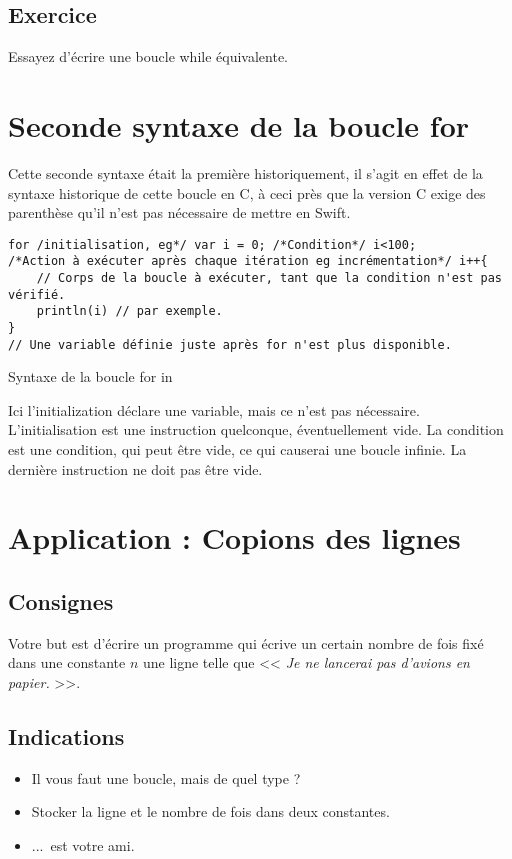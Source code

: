 \subsection{Exercice}
Essayez d'écrire une boucle while équivalente.

\section{Seconde syntaxe de la boucle for}
Cette seconde syntaxe était la première historiquement,
il s'agit en effet de la syntaxe historique de cette boucle en C,
à ceci près que la version C exige des parenthèse
qu'il n'est pas nécessaire de mettre en Swift.

\begin{listing}[h]
\begin{verbatim}
for /initialisation, eg*/ var i = 0; /*Condition*/ i<100;
/*Action à exécuter après chaque itération eg incrémentation*/ i++{
    // Corps de la boucle à exécuter, tant que la condition n'est pas vérifié.
    println(i) // par exemple.
}
// Une variable définie juste après for n'est plus disponible.
\end{verbatim}
\caption{Syntaxe de la boucle for in}
\end{listing}
Ici l'initialization déclare une variable,
mais ce n'est pas nécessaire.
L'initialisation est une instruction quelconque, éventuellement vide.
La condition est une condition, qui peut être vide, ce qui causerai une boucle infinie.
La dernière instruction ne doit pas être vide.
\section{Application : Copions des lignes}
\subsection{Consignes}
Votre but est d'écrire un programme qui
écrive un certain nombre de fois fixé dans une constante $n$ une ligne telle que << \emph{Je ne lancerai pas d'avions en papier.} >>.
\pagebreak %
\subsection{Indications}
\begin{itemize}
\item Il vous faut une boucle, mais de quel type ?

\item Stocker la ligne et le nombre de fois dans deux constantes.

\item ...\ est votre ami.
\end{itemize}
\pagebreak %
